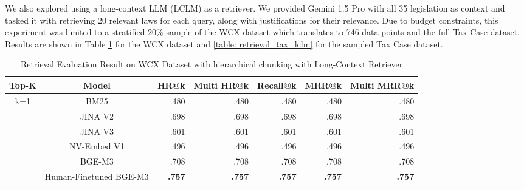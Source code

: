 We also explored using a long-context LLM (LCLM) as a retriever. We provided Gemini 1.5 Pro with all 35 legislation as context and tasked it with retrieving 20 relevant laws for each query, along with justifications for their relevance. Due to budget constraints, this experiment was limited to a stratified 20\% sample of the WCX dataset which translates to 746 data points and the full Tax Case dataset. Results are shown in Table \ref{table: retrieval_wcx_lclm} for the WCX dataset and \ref{table: retrieval_tax_lclm} for the sampled Tax Case dataset.

\begin{table}[ht]
\centering
\caption{Retrieval Evaluation Result on WCX Dataset with hierarchical chunking with Long-Context Retriever}
\renewcommand{\arraystretch}{1.5} %
\label{table: retrieval_wcx_lclm}
\begin{tabular}{@{}ccrrrrr@{}}
\toprule
Top-K                 & Model                  & \multicolumn{1}{c}{HR@k} & \multicolumn{1}{c}{Multi HR@k} & \multicolumn{1}{c}{Recall@k} & \multicolumn{1}{c}{MRR@k} & \multicolumn{1}{c}{Multi MRR@k} \\ \midrule
\multirow{9}{*}{k=1}  & BM25                   & .480                    & .480                          & .480                        & .480                     & .480                           \\
                      & JINA V2                & .698                    & .698                          & .698                        & .698                     & .698                           \\
                      & JINA V3                & .601                    & .601                          & .601                        & .601                     & .601                           \\
                      & NV-Embed V1            & .496                    & .496                          & .496                        & .496                     & .496                           \\
                      & BGE-M3                 & .708                    & .708                          & .708                        & .708                     & .708                           \\
                      & Human-Finetuned BGE-M3 & \textbf{.757}           & \textbf{.757}                 & \textbf{.757}               & \textbf{.757}            & \textbf{.757}                  \\

\end{tabular}
\end{table}
